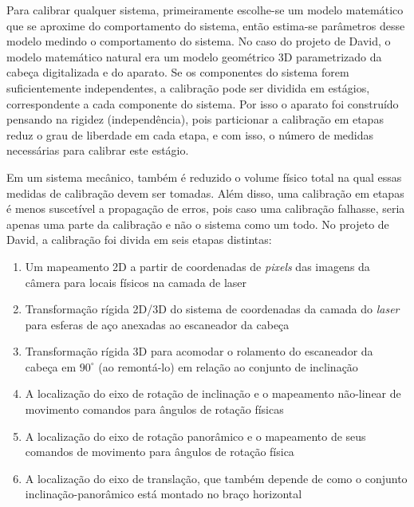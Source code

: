 Para calibrar qualquer sistema, primeiramente escolhe-se um modelo matemático que se aproxime do comportamento do sistema, então estima-se parâmetros desse modelo medindo o comportamento do sistema. No caso do projeto de David, o modelo matemático natural era um modelo geométrico 3D parametrizado da cabeça digitalizada e do aparato. Se os componentes do sistema forem suficientemente independentes, a calibração pode ser dividida em estágios, correspondente a cada componente do sistema. Por isso o aparato foi construído pensando na rigidez (independência), pois particionar a calibração em etapas reduz o grau de liberdade em cada etapa, e com isso, o número de medidas necessárias para calibrar este estágio.

Em um sistema mecânico, também é reduzido o volume físico total na qual essas medidas de calibração devem ser tomadas. Além disso, uma calibração em etapas é menos suscetível a propagação de erros, pois caso uma calibração falhasse, seria apenas uma parte da calibração e não o sistema como um todo. No projeto de David, a calibração foi divida em seis etapas distintas:

\begin{enumerate}
\item{Um mapeamento 2D a partir de coordenadas de \emph{pixels} das imagens da câmera para locais físicos na camada de laser}
\item{Transformação rígida 2D/3D do sistema de coordenadas da camada do \emph{laser} para esferas de aço anexadas ao escaneador da cabeça}
\item{Transformação rígida 3D para acomodar o rolamento do escaneador da cabeça em $90^{\circ}$ (ao remontá-lo) em relação ao conjunto de inclinação}
\item{A localização do eixo de rotação de inclinação e o mapeamento não-linear de movimento comandos para ângulos de rotação físicas}
\item{A localização do eixo de rotação panorâmico e o mapeamento de seus comandos de movimento para ângulos de rotação física}
\item{A localização do eixo de translação, que também depende de como o conjunto inclinação-panorâmico está montado no braço horizontal}
\end{enumerate}

